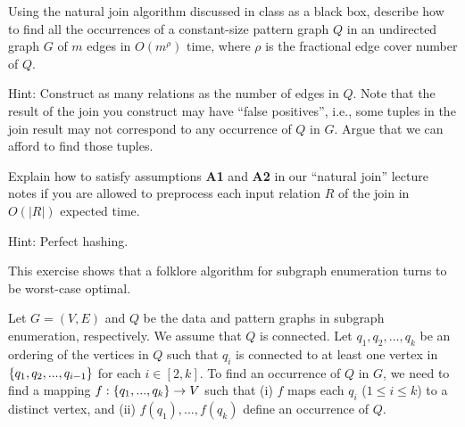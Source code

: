 \vgap


 Using the natural join algorithm discussed in class as a black box, describe how to find all the occurrences of a constant-size pattern graph $Q$ in an undirected graph $G$ of $m$ edges in $O(m^{\rho})$ time, where $\rho$ is the fractional edge cover number of $Q$.

\vgap

Hint: Construct as many relations as the number of edges in $Q$. Note that the result of the join you construct may have ``false positives'', i.e., some tuples in the join result may not correspond to any occurrence of $Q$ in $G$. Argue that we can afford to find those tuples.

 Explain how to satisfy assumptions {\bf A1} and {\bf A2} in our ``natural join'' lecture notes if you are allowed to preprocess each input relation $R$ of the join in $O(|R|)$ expected time.

\vgap

Hint: Perfect hashing.

 This exercise shows that a folklore algorithm for subgraph enumeration turns to be worst-case optimal.

\vgap

Let $G = (V, E)$ and $Q$ be the data and pattern graphs in subgraph enumeration, respectively. We assume that $Q$ is connected. Let $q_1, q_2, ..., q_k$ be an ordering of the vertices in $Q$ such that $q_i$ is connected to at least one vertex in $\{q_1, q_2, ..., q_{i-1}\}$ for each $i \in [2, k]$. To find an occurrence of $Q$ in $G$, we need to find a mapping $f: \{q_1, ..., q_k\} \rightarrow V$ such that (i) $f$ maps each $q_i$ ($1 \le i \le k$) to a distinct vertex, and (ii) $f(q_1), ..., f(q_k)$ define an occurrence of $Q$.

